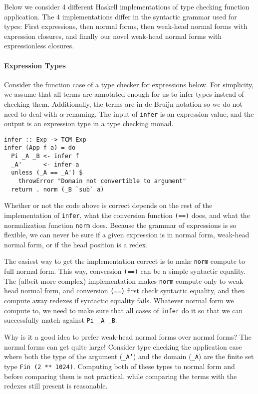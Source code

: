 \documentclass[preprint,authoryear]{sigplanconf}
\begin{document}
Below we consider 4 different Haskell implementations of type checking
function application. The 4 implementations differ in the syntactic
grammar used for types: First expressions, then normal forms, then
weak-head normal forms with expression closures, and finally our novel
weak-head normal forms with expressionless closures.

\paragraph{Expression Types}

Consider the function case of a type checker for expressions below.
For simplicity, we assume that all terms are annotated enough for us
to infer types instead of checking them. Additionally, the terms are
in de Bruijn notation so we do not need to deal with $\alpha$-renaming.
The input of \texttt{infer} is an expression
value, and the output is an expression type in a type checking monad.

\begin{verbatim}
infer :: Exp -> TCM Exp
infer (App f a) = do
  Pi _A _B <- infer f
  _A'      <- infer a
  unless (_A == _A') $
    throwError "Domain not convertible to argument"
  return . norm (_B `sub` a)
\end{verbatim}

Whether or not the code above is correct depends on the rest of the
implementation of \texttt{infer}, what the conversion function
\texttt{(==)} does, and what the normalization function
\texttt{norm} does. Because the grammar of expressions is so flexible,
we can never be sure if a given expression is in normal form,
weak-head normal form, or if the head position is a redex.

The easiest way to get the implementation correct is to make
\texttt{norm} compute to full normal form. This way,
conversion \texttt{(==)} can be a simple syntactic equality. The
(albeit more complex) implementation makes \texttt{norm} compute only
to weak-head normal form, and conversion \texttt{(==)} first check
syntactic equality, and then compute away redexes if syntactic
equality fails. Whatever normal form we compute to, we need to make
sure that all cases of \texttt{infer} do it so that we can
successfully match against \texttt{Pi \_A \_B}.

Why is it a good idea to prefer weak-head normal forms over normal
forms? The normal forms can get quite large! Consider type checking
the application case where both the type of the argument (\texttt{\_A'})
and the domain (\texttt{\_A}) are the finite set type
\texttt{Fin (2 ** 1024)}. Computing both of these types to normal form
and before comparing them is not practical, while comparing the
terms with the redexes still present is reasonable.
\end{document}
